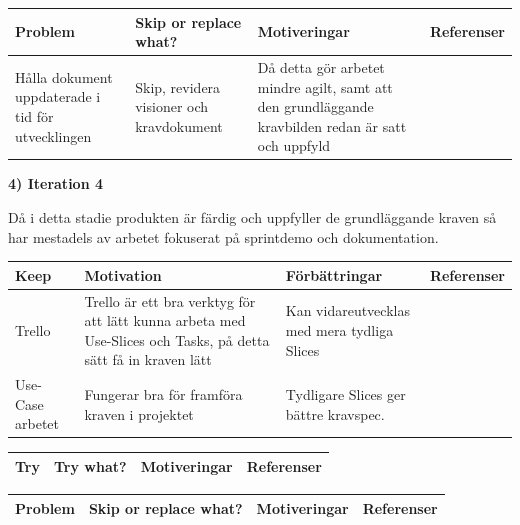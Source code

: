 \documentclass[conference,a4paper]{IEEEtran}
\newcommand\Tstrut{\rule{0pt}{2.6ex}}       %
\newcommand\Bstrut{\rule[-0.9ex]{0pt}{0pt}} %
\newcommand{\TBstrut}{\Tstrut\Bstrut} %
\begin{document}
\begin{table}[H]
	\small
  \centering
	\begin{tabular}{|p{1.5cm}|p{2cm}|p{1.8cm}|p{1.5cm}|} %
    \hline
    Problem & Skip or replace what? & Motiveringar & Referenser \TBstrut \\
    \hline
    Hålla dokument uppdaterade i tid för utvecklingen & Skip, revidera visioner och kravdokument & Då detta gör arbetet mindre agilt, samt att den grundläggande kravbilden redan är satt och uppfyld  &  \TBstrut \\
    \hline

  \end{tabular}
\end{table}

\textbf{4) Iteration 4}

Då i detta stadie produkten är färdig och uppfyller de grundläggande kraven så har mestadels av arbetet fokuserat på sprintdemo och dokumentation.

\begin{table}[H]
	\small
  \centering
	\begin{tabular}{|p{1.5cm}|p{2cm}|p{1.8cm}|p{1.5cm}|} %
    \hline
    Keep & Motivation & Förbättringar & Referenser \TBstrut \\
    \hline
     Trello & Trello är ett bra verktyg för att lätt kunna arbeta med Use-Slices och Tasks, på detta sätt få in kraven lätt & Kan vidareutvecklas med mera tydliga Slices & \cite{Jacobson11} \TBstrut \\
    \hline
    Use-Case arbetet & Fungerar bra för framföra kraven i projektet & Tydligare Slices ger bättre kravspec. &\cite{Jacobson11} \TBstrut \\
    \hline
  \end{tabular}
\end{table}

\begin{table}[H]
	\small
  \centering
	\begin{tabular}{|p{1.5cm}|p{2cm}|p{1.8cm}|p{1.5cm}|} %
    \hline
    Try & Try what? & Motiveringar & Referenser \TBstrut \\
    \hline

  \end{tabular}
\end{table}

\begin{table}[H]
	\small
  \centering
	\begin{tabular}{|p{1.5cm}|p{2cm}|p{1.8cm}|p{1.5cm}|} %
    \hline
    Problem & Skip or replace what? & Motiveringar & Referenser \TBstrut \\
    \hline


  \end{tabular}
\end{table}
\end{document}
